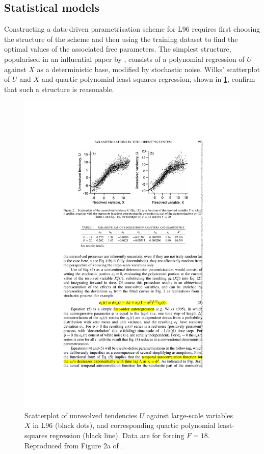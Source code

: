 \documentclass[titlepage,twoside]{article}
\numberwithin{equation}{section}
\begin{document}
\subsection{Statistical models}
Constructing a data-driven parametrisation scheme for L96 requires first
choosing the structure of the scheme and then using the training dataset to
find the optimal values of the associated free parameters. The simplest
structure, popularised in an influential paper by \textcite{wilks2005},
consists of a polynomial regression of $U$ against $X$ as a deterministic base,
modified by stochastic noise. Wilks' scatterplot of $U$ and $X$ and quartic
polynomial least-squares regression, shown in \cref{fig:wilks2005_regression},
confirm that such a structure is reasonable.

\begin{figure}[ht]
    \centering
    \includegraphics[width=0.3\linewidth]{figures/wilks2005_regression.pdf}
    \caption{
        Scatterplot of unresolved tendencies $U$ against large-scale variables
        $X$ in L96 (black dots), and corresponding quartic polynomial
        least-squares regression (black line). Data are for forcing $F=18$.
        Reproduced from Figure 2a of \textcite{wilks2005}.
    }
    \label{fig:wilks2005_regression}
\end{figure}
\end{document}
